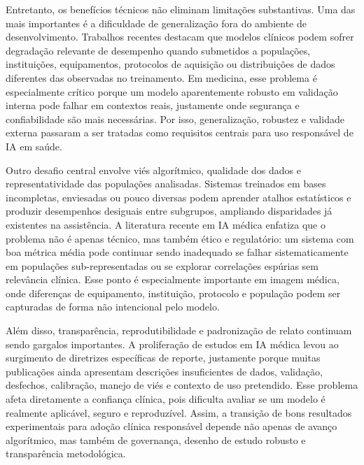 \documentclass[tcc,capa]{texufpel}
\begin{document}
Entretanto, os benefícios técnicos não eliminam limitações substantivas. Uma das mais importantes é a dificuldade de generalização fora do ambiente de desenvolvimento. Trabalhos recentes destacam que modelos clínicos podem sofrer degradação relevante de desempenho quando submetidos a populações, instituições, equipamentos, protocolos de aquisição ou distribuições de dados diferentes das observadas no treinamento. Em medicina, esse problema é especialmente crítico porque um modelo aparentemente robusto em validação interna pode falhar em contextos reais, justamente onde segurança e confiabilidade são mais necessárias. Por isso, generalização, robustez e validade externa passaram a ser tratadas como requisitos centrais para uso responsável de IA em saúde. \cite{Goetz2024Generalization,WHO2021AI,FUTUREAI2025,Arun2025ExternalValidation}

Outro desafio central envolve viés algorítmico, qualidade dos dados e representatividade das populações analisadas. Sistemas treinados em bases incompletas, enviesadas ou pouco diversas podem aprender atalhos estatísticos e produzir desempenhos desiguais entre subgrupos, ampliando disparidades já existentes na assistência. A literatura recente em IA médica enfatiza que o problema não é apenas técnico, mas também ético e regulatório: um sistema com boa métrica média pode continuar sendo inadequado se falhar sistematicamente em populações sub-representadas ou se explorar correlações espúrias sem relevância clínica. Esse ponto é especialmente importante em imagem médica, onde diferenças de equipamento, instituição, protocolo e população podem ser capturadas de forma não intencional pelo modelo. \cite{WHO2021AI,Ueda2024Fairness,Kocak2025Bias,Yang2024FairMedicalImaging}

Além disso, transparência, reprodutibilidade e padronização de relato continuam sendo gargalos importantes. A proliferação de estudos em IA médica levou ao surgimento de diretrizes específicas de reporte, justamente porque muitas publicações ainda apresentam descrições insuficientes de dados, validação, desfechos, calibração, manejo de viés e contexto de uso pretendido. Esse problema afeta diretamente a confiança clínica, pois dificulta avaliar se um modelo é realmente aplicável, seguro e reproduzível. Assim, a transição de bons resultados experimentais para adoção clínica responsável depende não apenas de avanço algorítmico, mas também de governança, desenho de estudo robusto e transparência metodológica. \cite{CONSORTAI2020,SPIRITAI2020,TRIPODAI2024,PROBASTAI2025,Kolbinger2024Reporting}
\end{document}
